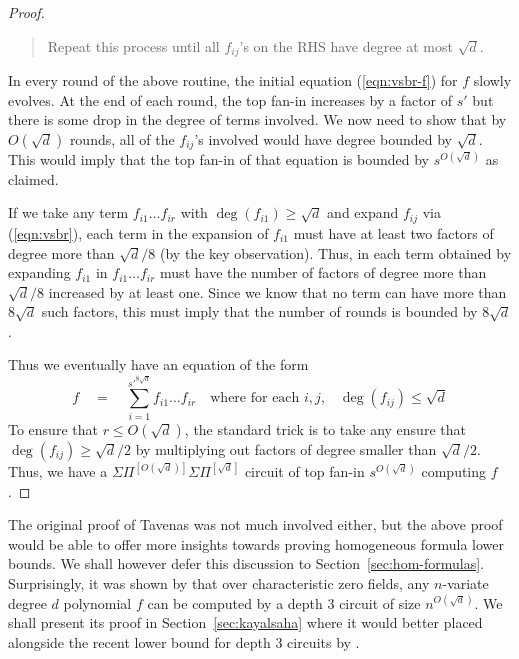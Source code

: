 \documentclass[12pt]{report}
\newcommand{\SPSPfanin}[2]{\Sigma\Pi^{[#1]}\Sigma\Pi^{[#2]}}
\begin{document}
\begin{proof}
\begin{mdframed}
\begin{quote}
Repeat this process until all $f_{ij}$'s on the RHS have degree at most $\sqrt{d}$. 
\end{quote}
\end{mdframed}

In every round of the above routine, the initial equation (\ref{eqn:vsbr-f}) for $f$ slowly evolves. 
At the end of each round, the top fan-in increases by a factor of $s'$ but there is some drop in the degree of terms involved. We now need to show that by $O(\sqrt{d})$ rounds, all of the $f_{ij}$'s involved would have degree bounded by $\sqrt{d}$. This would imply that the top fan-in of that equation is bounded by $s^{O(\sqrt{d})}$ as claimed. 

If we take any term $f_{i1}\dots f_{ir}$ with $\deg(f_{i1})\geq \sqrt{d}$ and expand $f_{ij}$ via (\ref{eqn:vsbr}), each term in the expansion of $f_{i1}$ must have at least two factors of degree more than $\sqrt{d}/8$ (by the key observation). Thus, in each term obtained by expanding $f_{i1}$ in $f_{i1}\dots f_{ir}$ must have the number of factors of degree more than $\sqrt{d}/8$ increased by at least one. Since we know that no term can have more than $8\sqrt{d}$ such factors, this must imply that the number of rounds is bounded by $8\sqrt{d}$. 

Thus we eventually have an equation of the form
\[
f\quad=\quad \sum_{i=1}^{s'^{8\sqrt{d}}} f_{i1}\dots f_{ir}\quad\text{where for each $i,j$,}\quad \deg(f_{ij})\leq \sqrt{d} 
\]
To ensure that $r\leq O(\sqrt{d})$, the standard trick is to take any ensure that $\deg(f_{ij}) \geq \sqrt{d}/2$ by multiplying out factors of degree smaller than $\sqrt{d}/2$. Thus, we have a $\SPSPfanin{O(\sqrt{d})}{\sqrt{d}}$ circuit of top fan-in $s^{O(\sqrt{d})}$ computing $f$. 
\end{proof}

The original proof of Tavenas was not much involved either, but the above proof would be able to offer more insights towards proving homogeneous formula lower bounds. We shall however defer this discussion to Section~\ref{sec:hom-formulas}. 
\\

Surprisingly, it was shown by \cite{gkks13b} that over characteristic zero fields, any $n$-variate degree $d$ polynomial $f$ can be computed by a depth $3$ circuit of size $n^{O(\sqrt{d})}$. We shall present its proof in Section~\ref{sec:kayalsaha} where it would better placed alongside the recent lower bound for depth $3$ circuits by \cite{KayalSaha14}. 
\end{document}
